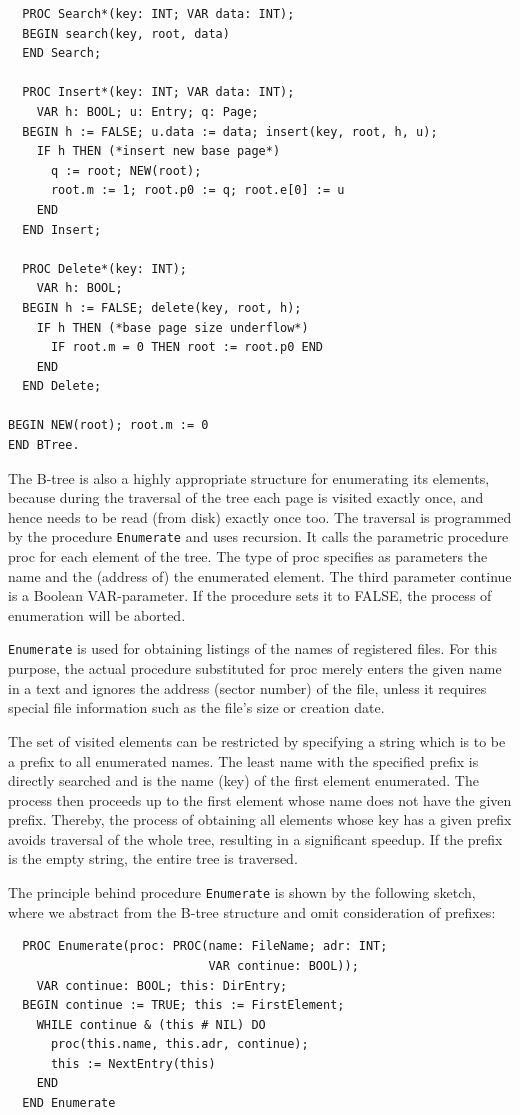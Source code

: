 \begin{verbatim}
  PROC Search*(key: INT; VAR data: INT);
  BEGIN search(key, root, data)
  END Search;

  PROC Insert*(key: INT; VAR data: INT);
    VAR h: BOOL; u: Entry; q: Page;
  BEGIN h := FALSE; u.data := data; insert(key, root, h, u);
    IF h THEN (*insert new base page*)
      q := root; NEW(root);
      root.m := 1; root.p0 := q; root.e[0] := u
    END
  END Insert;

  PROC Delete*(key: INT);
    VAR h: BOOL;
  BEGIN h := FALSE; delete(key, root, h);
    IF h THEN (*base page size underflow*)
      IF root.m = 0 THEN root := root.p0 END
    END
  END Delete;

BEGIN NEW(root); root.m := 0
END BTree.
\end{verbatim}

The B-tree is also a highly appropriate structure for enumerating its elements, because during the
traversal of the tree each page is visited exactly once, and hence needs to be read (from disk)
exactly once too. The traversal is programmed by the procedure \verb|Enumerate| and uses recursion.
It calls the parametric procedure proc for each element of the tree. The type of proc specifies as
parameters the name and the (address of) the enumerated element. The third parameter continue is a
Boolean VAR-parameter. If the procedure sets it to FALSE, the process of enumeration will be aborted.

\verb|Enumerate| is used for obtaining listings of the names of registered files. For this purpose, the
actual procedure substituted for proc merely enters the given name in a text and ignores the address
(sector number) of the file, unless it requires special file information such as the file's size or
creation date.

The set of visited elements can be restricted by specifying a string which is to be a prefix to all
enumerated names. The least name with the specified prefix is directly searched and is the name (key)
of the first element enumerated. The process then proceeds up to the first element whose name does not
have the given prefix. Thereby, the process of obtaining all elements whose key has a given prefix
avoids traversal of the whole tree, resulting in a significant speedup. If the prefix is the empty
string, the entire tree is traversed.

The principle behind procedure \verb|Enumerate| is shown by the following sketch, where we abstract
from the B-tree structure and omit consideration of prefixes:
\begin{verbatim}
  PROC Enumerate(proc: PROC(name: FileName; adr: INT;
                            VAR continue: BOOL));
    VAR continue: BOOL; this: DirEntry;
  BEGIN continue := TRUE; this := FirstElement;
    WHILE continue & (this # NIL) DO
      proc(this.name, this.adr, continue);
      this := NextEntry(this)
    END
  END Enumerate
\end{verbatim}

